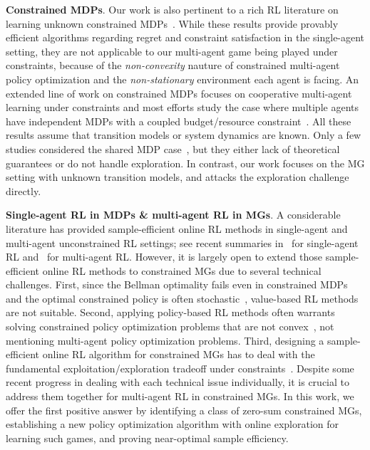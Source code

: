 \documentclass[12pt, final]{l4dc2023}
\begin{document}
\noindent\textbf{Constrained MDPs}. Our work is also pertinent to a rich RL literature on learning unknown constrained MDPs~\citep{zheng2020constrained,qiu2020upper,kalagarla2020sample,bai2020model,chow2017risk,tessler2018reward,ding2020natural,ding2020provably,ding2022convergence,ding2022convergenceACC,ding2022policy,wachi2020safe,efroni2020exploration,brantley2020constrained,chen2021primal,liu2021learning,ying2021dual,liu2021fast,bai2021achieving,zhao2021primal,li2021faster,chen2022learning}. While these results provide provably efficient algorithms regarding regret and constraint satisfaction in the single-agent setting, they are not applicable to our multi-agent game being played under constraints, because of the \emph{non-convexity} nauture of constrained multi-agent policy optimization and the \emph{non-stationary} environment each agent is facing. An extended line of work on constrained MDPs focuses on cooperative multi-agent learning under constraints and most efforts study the case where multiple agents have independent MDPs with a coupled budget/resource constraint~\citep{meuleau1998solving,boutilier2016budget,wei2018online,de2020risk,gagrani2020weakly}. All these results assume that transition models or system dynamics are known. Only a few studies considered the shared MDP case~\citep{diddigi2019actor,ludecentralized,parnika2021attention,gu2021multi}, but they either lack of theoretical guarantees or do not handle exploration. In contrast, our work focuses on the MG setting with unknown transition models, and attacks the exploration challenge directly.

\noindent\textbf{Single-agent RL in MDPs \& multi-agent RL in MGs}.
A considerable literature has provided sample-efficient online RL methods in single-agent and multi-agent unconstrained RL settings; see recent summaries in~\cite{foster2021statistical,du2021bilinear,jin2021bellman} for single-agent RL and~\cite{jin2021power,jin2021v,song2021can} for multi-agent RL. However, it is largely open to extend those sample-efficient online RL methods to constrained MGs due to several technical challenges. First, since the Bellman optimality fails even in constrained MDPs~\citep{piunovskiy2000constrained,borkar2005actor} and the optimal constrained policy is often stochastic~\citep{altman1999constrained}, value-based RL methods are not suitable. Second, applying policy-based RL methods often warrants solving constrained policy optimization problems that are not convex~\citep{achiam2017constrained,ding2020natural}, not mentioning multi-agent policy optimization problems. Third, designing a sample-efficient online RL algorithm for constrained MGs has to deal with the fundamental exploitation/exploration tradeoff under constraints~\citep{efroni2020exploration,brantley2020constrained,ding2020provably}. Despite some recent progress in dealing with each technical issue individually, it is crucial to address them together for multi-agent RL in constrained MGs. In this work, we offer the first positive answer by identifying a class of zero-sum constrained MGs, establishing a new policy optimization algorithm with online exploration for learning such games, and proving near-optimal sample efficiency.
\end{document}
